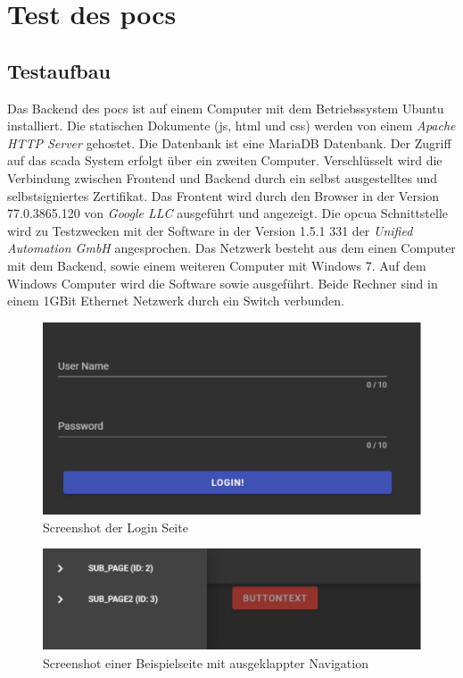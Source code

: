 \section{Test des \acp{poc} }\label{sec:poc:test}
\subsection{Testaufbau}
Das Backend des \acp{poc} ist auf einem Computer mit dem Betriebssystem Ubuntu installiert. 
Die statischen Dokumente (\ac{js}, \ac{html} und \ac{css}) werden von einem \emph{Apache HTTP Server} gehostet.
Die Datenbank ist eine MariaDB Datenbank.
Der Zugriff auf das \ac{scada} System erfolgt über ein zweiten Computer.
Verschlüsselt wird die Verbindung zwischen Frontend und Backend durch ein selbst ausgestelltes und selbstsigniertes Zertifikat.
Das Frontent wird durch den Browser  in der Version 77.0.3865.120 von \emph{Google LLC} ausgeführt und angezeigt.
Die \ac{opcua} Schnittstelle wird zu Testzwecken mit der Software  in der Version 1.5.1 331 der \emph{Unified Automation GmbH} angesprochen.
Das Netzwerk besteht aus dem einen Computer mit dem Backend, sowie einem weiteren Computer mit Windows 7.
Auf dem Windows Computer wird die Software  sowie  ausgeführt.
Beide Rechner sind in einem  1GBit Ethernet Netzwerk durch ein Switch verbunden.

\begin{figure}
  \centering
  \includegraphics[width=\textwidth]{content/hauptteil/umsetzungPoC/pocTest/res/screenLogin.pdf}
  \caption{Screenshot der Login Seite}
  \label{fig:frontend:poc:login}
\end{figure}


\begin{figure}[ht]
  \centering
  \includegraphics[width=\textwidth]{content/hauptteil/umsetzungPoC/pocTest/res/screenPageNav.pdf}
  \caption{Screenshot einer Beispielseite mit ausgeklappter Navigation}
  \label{fig:frontend:poc:nav}
\end{figure}


